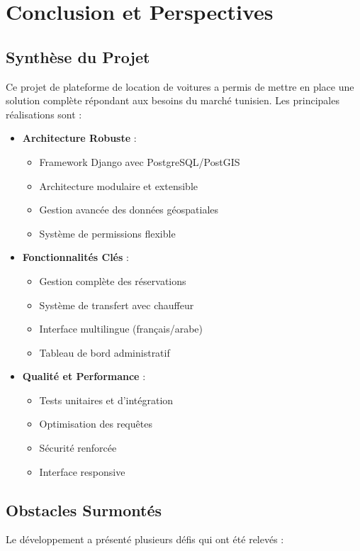 \chapter{Conclusion et Perspectives}
\label{chap:Conclusion}

\section{Synthèse du Projet}
Ce projet de plateforme de location de voitures a permis de mettre en place une solution complète répondant aux besoins du marché tunisien. Les principales réalisations sont :

\begin{itemize}
    \item \textbf{Architecture Robuste} :
    \begin{itemize}
        \item Framework Django avec PostgreSQL/PostGIS
        \item Architecture modulaire et extensible
        \item Gestion avancée des données géospatiales
        \item Système de permissions flexible
    \end{itemize}
    
    \item \textbf{Fonctionnalités Clés} :
    \begin{itemize}
        \item Gestion complète des réservations
        \item Système de transfert avec chauffeur
        \item Interface multilingue (français/arabe)
        \item Tableau de bord administratif
    \end{itemize}
    
    \item \textbf{Qualité et Performance} :
    \begin{itemize}
        \item Tests unitaires et d'intégration
        \item Optimisation des requêtes
        \item Sécurité renforcée
        \item Interface responsive
    \end{itemize}
\end{itemize}

\section{Obstacles Surmontés}
Le développement a présenté plusieurs défis qui ont été relevés :

